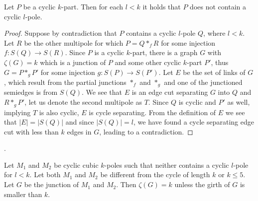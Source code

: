 \documentclass[12pt, twoside]{book}
\begin{document}

\begin{lemma}\label{lem:cyclic-part-no-small-cyclic-l-pole}
	Let $P$ be a cyclic $k$-part. Then for each $l<k$ it holds that $P$ does not contain a cyclic $l$-pole.
\end{lemma}

\begin{proof}
	Suppose by contradiction that $P$ contains a cyclic $l$-pole $Q$, where $l<k$. Let $R$ be the other multipole for which $P=Q*_fR$ for some injection $f:S(Q)\rightarrow S(R)$. Since $P$ is a cyclic $k$-part, there is a graph $G$ with $\zeta(G)=k$ which is a junction of $P$ and some other cyclic $k$-part $P'$, thus $G=P*_gP'$ for some injection $g:S(P)\rightarrow S(P')$. Let $E$ be the set of links of $G$, which result from the partial junctions $*_f$ and $*_g$ and one of the junctioned semiedges is from $S(Q)$. We see that $E$ is an edge cut separating $G$ into $Q$ and $R*_gP'$, let us denote the second multipole as $T$. Since $Q$ is cyclic and $P'$ as well, implying $T$ is also cyclic, $E$ is cycle separating. From the definition of $E$ we see that $|E|=|S(Q)|$ and since $|S(Q)|=l$, we have found a cycle separating edge cut with less than $k$ edges in $G$, leading to a contradiction.
\end{proof}

.

\begin{theorem}\label{th:junction-of-kpoles-cyclic-edge-connectivity}
	Let $M_1$ and $M_2$ be cyclic cubic $k$-poles such that neither contains a cyclic $l$-pole for $l<k$. Let both $M_1$ and $M_2$ be different from the cycle of length $k$ or $k\leq 5$. Let $G$ be the junction of $M_1$ and $M_2$. Then $\zeta(G)=k$ unless the girth of $G$ is smaller than $k$.
\end{theorem}
\end{document}
